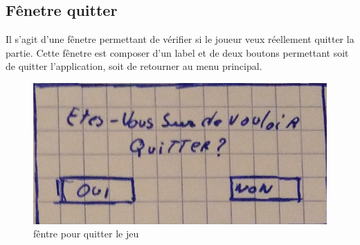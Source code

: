 \subsection{Fênetre quitter}
Il s'agit d'une fênetre permettant de vérifier si le joueur veux réellement quitter la partie. Cette fênetre est composer d'un label et de deux boutons permettant soit de quitter l'application, soit de retourner au menu principal.
\begin{figure}[ht]
	\centering
	\includegraphics[scale=0.5]{fenetre_quitter.png}
	\caption{fêntre pour quitter le jeu}
	\label{fênetre pour quitter le jeu}
\end{figure} 
